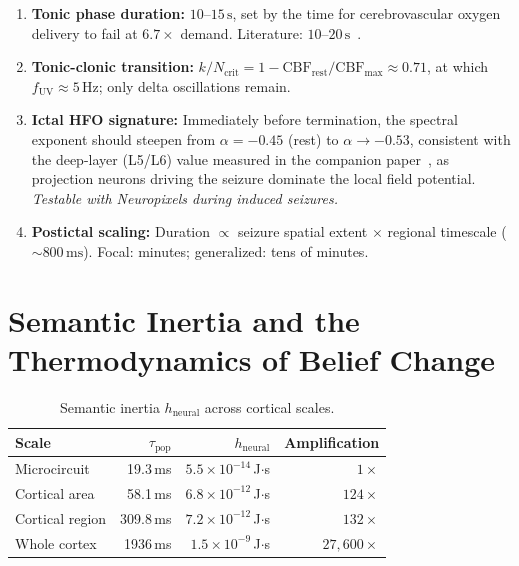 \documentclass[aps,pre,twocolumn,showpacs,superscriptaddress,longbibliography]{revtex4-2}
\newcommand{\kN}{k/N}
\newcommand{\taupop}{\tau_{\mathrm{pop}}}
\newcommand{\hneu}{h_{\mathrm{neural}}}
\newcommand{\fUV}{f_{\mathrm{UV}}}
\begin{document}
\begin{enumerate}
\item \textbf{Tonic phase duration:} $10$--$15\,\mathrm{s}$,
  set by the time for cerebrovascular oxygen delivery to fail
  at $6.7\times$ demand. Literature:
  $10$--$20\,\mathrm{s}$~\cite{Perucca2014}.~\checkmark

\item \textbf{Tonic-clonic transition:}
  $\kN_{\mathrm{crit}} = 1 - \mathrm{CBF}_{\mathrm{rest}}/
  \mathrm{CBF}_{\max} \approx 0.71$, at which
  $\fUV \approx 5\,\mathrm{Hz}$; only delta oscillations
  remain.~\checkmark

\item \textbf{Ictal HFO signature:}
  Immediately before termination, the spectral exponent should
  steepen from $\alpha = -0.45$ (rest) to $\alpha \to -0.53$,
  consistent with the deep-layer (L5/L6) value measured in the
  companion paper~\cite{Santos2025a}, as projection neurons
  driving the seizure dominate the local field potential.
  \emph{Testable with Neuropixels during induced seizures.}

\item \textbf{Postictal scaling:}
  Duration $\propto$ seizure spatial extent $\times$ regional
  timescale ($\sim 800\,\mathrm{ms}$). Focal: minutes;
  generalized: tens of minutes.~\checkmark
\end{enumerate}

\section{\label{sec:inertia}Semantic Inertia and the
         Thermodynamics of Belief Change}

\begin{table}[h]
\caption{\label{tab:h_scale}Semantic inertia $\hneu$ across
cortical scales.}
\begin{ruledtabular}
\begin{tabular}{lrrr}
Scale & $\taupop$ & $\hneu$ & Amplification \\
\hline
Microcircuit    &  19.3\,ms &
  $5.5\!\times\!10^{-14}$\,J$\cdot$s & $1\times$ \\
Cortical area   &  58.1\,ms &
  $6.8\!\times\!10^{-12}$\,J$\cdot$s & $124\times$ \\
Cortical region & 309.8\,ms &
  $7.2\!\times\!10^{-12}$\,J$\cdot$s & $132\times$ \\
Whole cortex    & 1936\,ms  &
  $1.5\!\times\!10^{-9}$\,J$\cdot$s  & $27{,}600\times$ \\
\end{tabular}
\end{ruledtabular}
\end{table}
\end{document}
